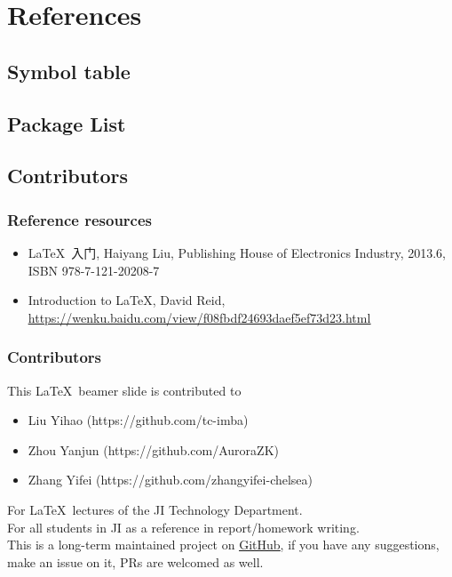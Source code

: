 \section{References}
\begin{frame}
\end{frame}

\subsection{Symbol table}

\begin{frame}

\end{frame}

\subsection{Package List}

\begin{frame}

\end{frame}

\subsection{Contributors}

\begin{frame}
	\frametitle{Reference resources}
	\songti
	\begin{itemize}
		\item \LaTeX\ 入门, Haiyang Liu, Publishing House of Electronics Industry, 2013.6, ISBN 978-7-121-20208-7
		\item Introduction to \LaTeX, David Reid, \href{https://wenku.baidu.com/view/f08fbdf24693daef5ef73d23.html}{\color{blue}\uline{https://wenku.baidu.com/view/f08fbdf24693daef5ef73d23.html}}
	\end{itemize}
\end{frame}

\begin{frame}
	\frametitle{Contributors}
	This \LaTeX\ beamer slide is contributed to
	\begin{itemize}
	\item Liu Yihao (https://github.com/tc-imba)\\
	\item Zhou Yanjun (https://github.com/AuroraZK)\\
	\item Zhang Yifei (https://github.com/zhangyifei-chelsea)
	\end{itemize}	
	For \LaTeX\ lectures of the JI Technology Department.\\
	For all students in JI as a reference in report/homework writing.\\[0.5em]
	
	This is a long-term maintained project on \href{https://github.com/SJTU-UMJI-Tech/LaTeX}{\color{blue}\underline{GitHub}}, if you have any suggestions, make an issue on it, PRs are welcomed as well.
	
\end{frame}
